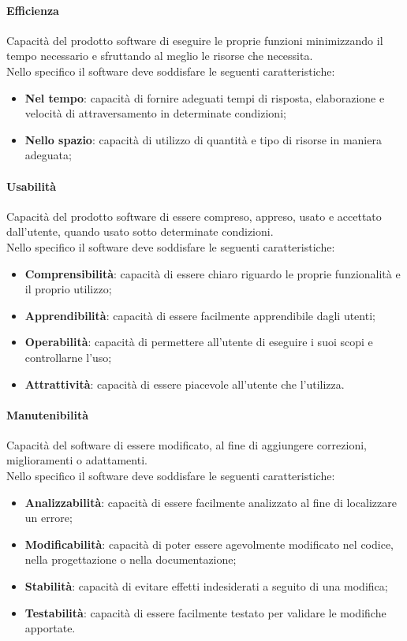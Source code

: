 		\paragraph{Efficienza}
		Capacità del prodotto software di eseguire le proprie funzioni minimizzando il tempo necessario e sfruttando al meglio le risorse che necessita.\\
		Nello specifico il software deve soddisfare le seguenti caratteristiche:
		\begin{itemize}
			\item \textbf{Nel tempo}: capacità di fornire adeguati tempi di risposta, elaborazione e velocità di attraversamento in determinate condizioni;
			\item \textbf{Nello spazio}: capacità di utilizzo di quantità e tipo di risorse in maniera adeguata;
		\end{itemize}
		\paragraph{Usabilità}
		Capacità del prodotto software di essere compreso, appreso, usato e accettato dall'utente, quando usato sotto determinate condizioni.\\
		Nello specifico il software deve soddisfare le seguenti caratteristiche:
		\begin{itemize}
			\item \textbf{Comprensibilità}: capacità di essere chiaro riguardo le proprie funzionalità e il proprio utilizzo;
			\item \textbf{Apprendibilità}: capacità di essere facilmente apprendibile dagli utenti;
			\item \textbf{Operabilità}: capacità di permettere all'utente di eseguire i suoi scopi e controllarne l'uso;
			\item \textbf{Attrattività}: capacità di essere piacevole all'utente che l'utilizza.
		\end{itemize}
		\paragraph{Manutenibilità}
		Capacità del software di essere modificato, al fine di aggiungere correzioni, miglioramenti o adattamenti.\\
		Nello specifico il software deve soddisfare le seguenti caratteristiche:
		\begin{itemize}
			\item \textbf{Analizzabilità}: capacità di essere facilmente analizzato al fine di localizzare un errore;
			\item \textbf{Modificabilità}: capacità di poter essere agevolmente modificato nel codice, nella progettazione o nella documentazione;
			\item \textbf{Stabilità}: capacità di evitare effetti indesiderati a seguito di una modifica;
			\item \textbf{Testabilità}: capacità di essere facilmente testato per validare le modifiche apportate.
		\end{itemize}
